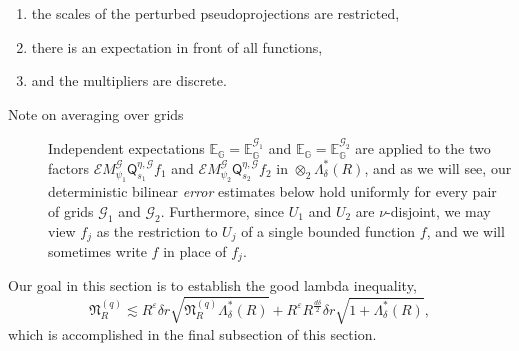 \documentclass{amsart}%
\theoremstyle{plain}
\numberwithin{equation}{section}
\begin{document}
\begin{enumerate}
\item the scales of the perturbed pseudoprojections are restricted,

\item there is an expectation in front of all functions,

\item and the multipliers are discrete.
\end{enumerate}

\begin{description}
\item[Note on averaging over grids] Independent expectations $\mathbb{E}%
_{\mathbb{G}}=\mathbb{E}_{\mathbb{G}}^{\mathcal{G}_{1}}$ and $\mathbb{E}%
_{\mathbb{G}}=\mathbb{E}_{\mathbb{G}}^{\mathcal{G}_{2}}$ are applied to the
two factors $\mathcal{E}M_{\psi_{1}}^{\mathcal{G}}\mathsf{Q}_{s_{1}}%
^{\eta,\mathcal{G}}f_{1}$ and $\mathcal{E}M_{\psi_{2}}^{\mathcal{G}}%
\mathsf{Q}_{s_{2}}^{\eta,\mathcal{G}}f_{2}$ in $\otimes_{2}\Lambda_{\delta
}^{\ast}\left(  R\right)  $, and as we will see, our deterministic bilinear
\emph{error} estimates below hold uniformly for every pair of grids
$\mathcal{G}_{1}$ and $\mathcal{G}_{2}$. Furthermore, since $U_{1}$ and
$U_{2}$ are $\nu$-disjoint, we may view $f_{j}$ as the restriction to $U_{j}$
of a single bounded function $f$, and we will sometimes write $f$ in place of
$f_{j}$.
\end{description}

Our goal in this section is to establish the good lambda inequality,%
\begin{equation}
\mathfrak{N}_{R}^{\left(  q\right)  }\lesssim R^{\varepsilon}\delta
r\sqrt{\mathfrak{N}_{R}^{\left(  q\right)  }\Lambda_{\delta}^{\ast}\left(
R\right)  }+R^{\varepsilon}R^{\frac{d\delta}{2}}\delta r\sqrt{1+\Lambda
_{\delta}^{\ast}\left(  R\right)  },\label{gli}%
\end{equation}
which is accomplished in the final subsection of this section.
\end{document}
